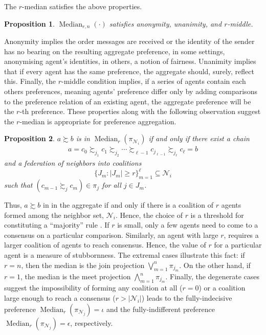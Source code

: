 \documentclass[conference]{ieeeconf}
\newcommand{\N}{\mathcal{N}}
\newcommand{\prefers}{\succsim}
\newcommand{\bigjoin}{\bigvee}
\newcommand{\bigmeet}{\bigwedge}
\renewcommand{\geq}{\geqslant}
\DeclareMathOperator{\Median}{Median}
\newtheorem{proposition}{Proposition}
\begin{document}
\noindent The $r$-median satisfies the above properties.

\begin{proposition}
    $\Median_{r,n}(\cdot)$ satisfies anonymity, unanimity, and $r$-middle.
\end{proposition}

Anonymity implies the order messages are received or the identity of the sender has no bearing on the resulting aggregate preference, in some settings, anonymising agent's identities, in others, a notion of fairness. Unanimity implies that if every agent has the same preference, the aggregate should, surely, reflect this. Finally, the $r$-middle condition implies, if a series of agents contain each others preferences, meaning agents' preference differ only by adding comparisons to the preference relation of an existing agent, the aggregate preference will be the $r$-th preference. These properties along with the following observation suggest the $r$-median is appropriate for preference aggregation.

\begin{proposition}
    $a \prefers b$ is in $\Median_r(\pi_{\N_i})$ if and only if there exist a chain
    \begin{align*}
        a = c_0 \prefers_{j_1} c_1 \prefers_{j_2} \cdots \prefers_{\ell-1} c_{j_{\ell-1}} \prefers_{j_\ell} c_{\ell} = b
    \end{align*}
    and a federation of neighbors into coalitions \[\{ J_m : |J_m| \geq r \}_{m=1}^{\ell} \subseteq \N_i\] such that $(c_{m-1} \prefers_{j} c_{m}) \in \pi_j$ for all  $j \in J_m$.
\end{proposition}

Thus, $a \prefers b$ in in the aggregate if and only if there is a coalition of $r$ agents formed among the neighbor set, $\N_i$. Hence, the choice of $r$ is a threshold for constituting a ``majority'' rule \cite{buchanan1965calculus}. If $r$ is small, only a few agents need to come to a consensus on a particular comparison. Similarly, an agent with large $r$, requires a larger coalition of agents to reach consensus. Hence, the value of $r$ for a particular agent is a measure of stubbornness. The extremal cases illustrate this fact: if $r= n$, then the median is the join projection $\bigjoin_{m=1}^n \pi_{j_m}$. On the other hand, if $r=1$, the median is the meet projection $\bigmeet_{m=1}^n \pi_{j_m}$. Finally, the degenerate cases suggest the impossibility of forming any coalition at all ($r=0$) or a coalition large enough to reach a consensus ($r > |\N_i|$) leads to the fully-indecisive preference $\Median_r(\pi_{\N_j}) = \iota$ and the fully-indifferent preference $\Median_r(\pi_{\N_j}) = \epsilon$, respectively.
\end{document}
